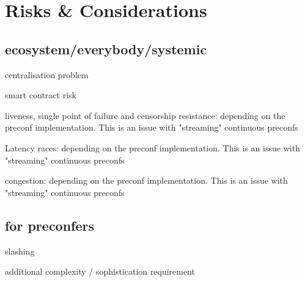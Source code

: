 \documentclass[conference]{IEEEtran}
\theoremstyle{boldstyle}
\begin{document}
    
\section{Risks \& Considerations} %
    \subsection{ecosystem/everybody/systemic}
    
    centralisation problem %

    smart contract risk %

    liveness, single point of failure and censorship resistance: depending on the preconf implementation. This is an issue with "streaming" continuous preconfs %
    
    Latency races: depending on the preconf implementation. This is an issue with "streaming" continuous preconfs %
    
    congestion: depending on the preconf implementation. This is an issue with "streaming" continuous preconfs %

    \subsection{for preconfers}
    slashing %
    
    additional complexity / sophistication requirement %
    
\end{document}
